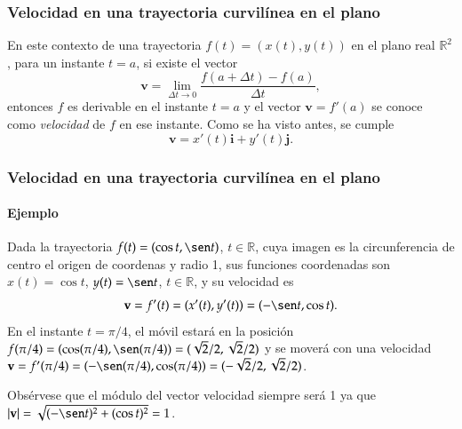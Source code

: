 \begin{frame}
	\frametitle{Velocidad en una trayectoria curvilínea en el plano}
	En este contexto de una trayectoria $f(t)=(x(t),y(t))$ en el plano real $\mathbb{R}^2$, para un instante $t=a$, si existe el vector
	\[
		\mathbf{v} = \lim_{\Delta t\rightarrow 0} \frac{f(a+\Delta t)-f(a)}{\Delta t},
	\]
	entonces $f$ es derivable en el instante $t=a$ y el vector $\mathbf{v}=f'(a)$ se conoce como \emph{velocidad} de $f$ en ese instante.
	Como se ha visto antes, se cumple
	\[
		\mathbf{v} = x'(t)\mathbf{i}+y'(t)\mathbf{j}.
	\]
\end{frame}


\begin{frame}
	\frametitle{Velocidad en una trayectoria curvilínea en el plano}
	\framesubtitle{Ejemplo}
	Dada la trayectoria $f(t) = (\cos t,\sen t)$, $t\in \mathbb{R}$, cuya imagen es la circunferencia de centro el origen
	de coordenas y radio 1, sus funciones coordenadas son $x(t) = \cos t$, $y(t) = \sen t$, $t\in \mathbb{R}$, y su velocidad es
	\[
		\mathbf{v}=f'(t)=(x'(t),y'(t))=(-\sen t, \cos t).
	\]
	En el instante $t=\pi/4$, el móvil estará en la posición $f(\pi/4) = (\cos(\pi/4),\sen(\pi/4)) =(\sqrt{2}/2,\sqrt{2}/2)$
	y se moverá con una velocidad $\mathbf{v}=f'(\pi/4)=(-\sen(\pi/4),\cos(\pi/4))=(-\sqrt{2}/2,\sqrt{2}/2)$.
	\begin{center}
		\scalebox{0.8}{}
	\end{center}
	Obsérvese que el módulo del vector velocidad siempre será 1 ya que
	$|\mathbf{v}|=\sqrt{(-\sen t)^2+(\cos t)^2}=1$.
\end{frame}



